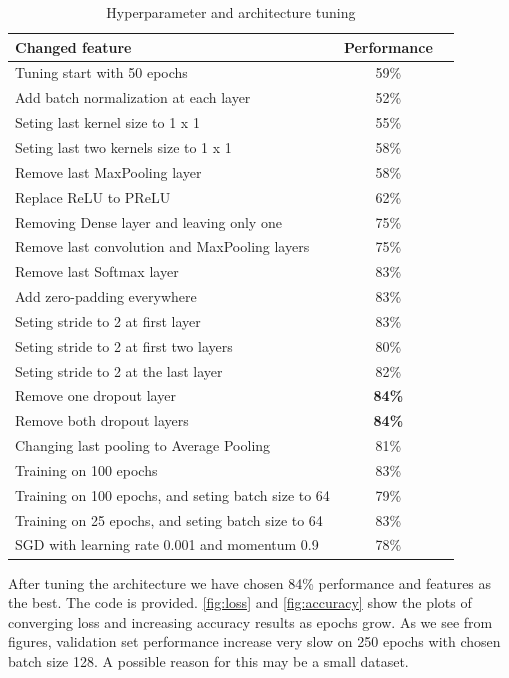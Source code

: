 \documentclass{IEEEtran}
\begin{document}
\begin{table}[!t]
\caption{Hyperparameter and architecture tuning}
\label{tab:tune}
\centering
\begin{tabular}{ l|c c }
\toprule
\textbf{Changed feature} & \textbf{Performance} \\
\hline
Tuning start with 50 epochs & 59\% \\
Add batch normalization at each layer & 52\% \\
Seting last kernel size to 1 x 1 & 55\% \\
Seting last two kernels size to 1 x 1 & 58\% \\
Remove last MaxPooling layer & 58\% \\
Replace ReLU to PReLU & 62\% \\
\hline
Removing Dense layer and leaving only one & 75\% \\
Remove last convolution and MaxPooling layers & 75\% \\
Remove last Softmax layer & 83\% \\
\hline
Add zero-padding everywhere & 83\% \\
Seting stride to 2 at first layer & 83\% \\
Seting stride to 2 at first two layers & 80\% \\
Seting stride to 2 at the last layer & 82\% \\
Remove one dropout layer & \textbf{84\%} \\
Remove both dropout layers & \textbf{84\%} \\
Changing last pooling to Average Pooling & 81\% \\
\hline
Training on 100 epochs & 83\% \\
Training on 100 epochs, and seting batch size to 64 & 79\% \\
Training on 25 epochs, and seting batch size to 64 & 83\% \\
SGD with learning rate 0.001 and momentum 0.9 & 78\% \\
\bottomrule
\end{tabular}
\end{table}

After tuning the architecture we have chosen 84\% performance and features as the best. The code is provided. \ref{fig:loss} and \ref{fig:accuracy} show the plots of converging loss and increasing accuracy results as epochs grow. As we see from figures, validation set performance increase very slow on 250 epochs with chosen batch size 128. A possible reason for this may be a small dataset.
\end{document}
